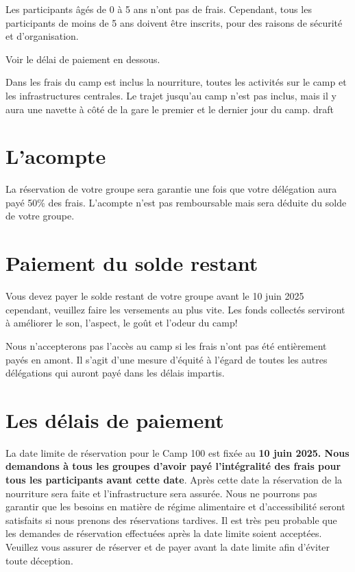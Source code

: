\documentclass[a4paper, 11pt]{report}
\begin{document}
Les participants \^ag\'es de 0 \`a 5 ans n'ont pas de frais. Cependant, tous les participants de moins de 5 ans doivent être inscrits, pour des raisons de s\'ecurit\'e et d'organisation.

Voir le d\'elai de paiement en dessous. 

Dans les frais du camp est inclus la nourriture, toutes les activit\'es sur le camp et les infrastructures centrales. Le trajet jusqu'au camp n'est pas inclus, mais il y aura une navette \`a c\^ot\'e de la gare le premier et le dernier jour du camp. 
draft

\section{L'acompte}
La r\'eservation de votre groupe sera garantie une fois que votre d\'el\'egation aura pay\'e 50\% des frais. L'acompte n'est pas remboursable mais sera d\'eduite du solde de votre groupe.

\section{Paiement du solde restant}
Vous devez payer le solde restant de votre groupe avant le 10 juin 2025 cependant, veuillez faire les versements au plus vite. Les fonds collect\'es serviront \`a am\'eliorer le son, l'aspect, le goût et l'odeur du camp! 

Nous n'accepterons pas l'acc\`es au camp si les frais n'ont pas \'et\'e enti\`erement pay\'es en amont. Il s'agit d'une mesure d'\'equit\'e \`a l'\'egard de toutes les autres d\'el\'egations qui auront pay\'e dans les d\'elais impartis.


\section{Les d\'elais de paiement}
La date limite de r\'eservation pour le Camp 100 est fix\'ee au \textbf{10 juin 2025. Nous demandons \`a tous les groupes d'avoir pay\'e l'int\'egralit\'e des frais pour tous les participants avant cette date}. Apr\`es cette date la r\'eservation de la nourriture sera faite et l'infrastructure sera assur\'ee. Nous ne pourrons pas garantir que les besoins en mati\`ere de r\'egime alimentaire et d'accessibilit\'e seront satisfaits si nous prenons des r\'eservations tardives. Il est tr\`es peu probable que les demandes de r\'eservation effectu\'ees apr\`es la date limite soient accept\'ees. Veuillez vous assurer de r\'eserver et de payer avant la date limite afin d'\'eviter toute d\'eception. 
\end{document}
